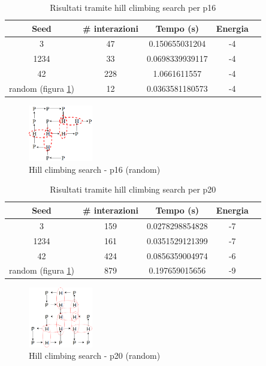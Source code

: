 \documentclass[conference]{IEEEtran}
\begin{document}
\begin{table}[H]
\begin{center}
\begin{tabular}{|c|c|c|c|c|}
\hline
\textbf{Seed} & \textbf{\# interazioni} & \textbf{Tempo (s)} & \textbf{Energia} \\ \hline
3 & 47 & 0.150655031204 & -4 \\ \hline
1234 & 33 & 0.0698339939117 & -4 \\ \hline
42 & 228 & 1.0661611557 & -4 \\ \hline
random (figura \ref{fig:lsp16}) & 12 & 0.0363581180573 & -4 \\ \hline
\end{tabular}
\end{center}
\caption{Risultati tramite hill climbing search per p16}
\end{table}

\begin{figure}[H]
\centering
\includegraphics[width=0.25\textwidth]{figure/LSP16.png}
\caption{Hill climbing search - p16 (random)}
\label{fig:lsp16}
\end{figure}

\begin{table}[H]
\begin{center}
\begin{tabular}{|c|c|c|c|c|}
\hline
\textbf{Seed} & \textbf{\# interazioni} & \textbf{Tempo (s)} & \textbf{Energia} \\ \hline
3 & 159 & 0.0278298854828 & -7 \\ \hline
1234 & 161 & 0.0351529121399 & -7 \\ \hline
42 & 424 & 0.0856359004974 & -6 \\ \hline
random (figura \ref{fig:lsp16}) & 879 & 0.197659015656 & -9 \\ \hline
\end{tabular}
\end{center}
\caption{Risultati tramite hill climbing search per p20}
\end{table}

\begin{figure}[H]
\centering
\includegraphics[width=0.25\textwidth]{figure/LSp20.png}
\caption{Hill climbing search - p20 (random)}
\label{fig:lsp20}
\end{figure}
\end{document}
